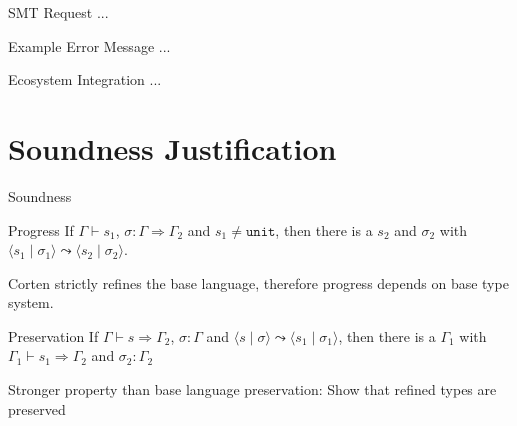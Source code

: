 \documentclass{sdqbeamer}
\newcommand{\code}[1]{\texttt{#1}}
\newcommand{\tuple}[2]{\langle #1 \mid #2 \rangle}
\begin{document}
\begin{frame}{SMT Request}
  ...
\end{frame}


\begin{frame}{Example Error Message}
  ...
\end{frame}


\begin{frame}{Ecosystem Integration}
  ...
\end{frame}

\section{Soundness Justification}

\begin{frame}[fragile]{Soundness}
  \begin{greenblock}{Progress}
    If $\Gamma \vdash s_1$, $\sigma : \Gamma \Rightarrow \Gamma_2$ and $s_1 \neq \code{unit}$, then there is a $s_2$ and $\sigma_2$ with $\tuple{s_1}{\sigma_1} \leadsto \tuple{s_2}{\sigma_2}$.
  \end{greenblock}

  Corten strictly refines the base language, therefore progress depends on base type system.

  \begin{greenblock}{Preservation}
    If $\Gamma \vdash s \Rightarrow \Gamma_2$, $\sigma : \Gamma$ and $\tuple{s}{\sigma} \leadsto \tuple{s_1}{\sigma_1}$, then there is a $\Gamma_1$ with $\Gamma_1 \vdash s_1 \Rightarrow \Gamma_2$ and $\sigma_2 : \Gamma_2$
  \end{greenblock}

  Stronger property than base language preservation: Show that refined types are preserved
\end{frame}
\end{document}
